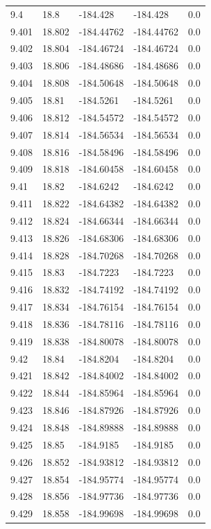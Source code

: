 \begin{tabular}{lllll}
9.4 & 18.8 & -184.428 & -184.428 & 0.0 \\
9.401 & 18.802 & -184.44762 & -184.44762 & 0.0 \\
9.402 & 18.804 & -184.46724 & -184.46724 & 0.0 \\
9.403 & 18.806 & -184.48686 & -184.48686 & 0.0 \\
9.404 & 18.808 & -184.50648 & -184.50648 & 0.0 \\
9.405 & 18.81 & -184.5261 & -184.5261 & 0.0 \\
9.406 & 18.812 & -184.54572 & -184.54572 & 0.0 \\
9.407 & 18.814 & -184.56534 & -184.56534 & 0.0 \\
9.408 & 18.816 & -184.58496 & -184.58496 & 0.0 \\
9.409 & 18.818 & -184.60458 & -184.60458 & 0.0 \\
9.41 & 18.82 & -184.6242 & -184.6242 & 0.0 \\
9.411 & 18.822 & -184.64382 & -184.64382 & 0.0 \\
9.412 & 18.824 & -184.66344 & -184.66344 & 0.0 \\
9.413 & 18.826 & -184.68306 & -184.68306 & 0.0 \\
9.414 & 18.828 & -184.70268 & -184.70268 & 0.0 \\
9.415 & 18.83 & -184.7223 & -184.7223 & 0.0 \\
9.416 & 18.832 & -184.74192 & -184.74192 & 0.0 \\
9.417 & 18.834 & -184.76154 & -184.76154 & 0.0 \\
9.418 & 18.836 & -184.78116 & -184.78116 & 0.0 \\
9.419 & 18.838 & -184.80078 & -184.80078 & 0.0 \\
9.42 & 18.84 & -184.8204 & -184.8204 & 0.0 \\
9.421 & 18.842 & -184.84002 & -184.84002 & 0.0 \\
9.422 & 18.844 & -184.85964 & -184.85964 & 0.0 \\
9.423 & 18.846 & -184.87926 & -184.87926 & 0.0 \\
9.424 & 18.848 & -184.89888 & -184.89888 & 0.0 \\
9.425 & 18.85 & -184.9185 & -184.9185 & 0.0 \\
9.426 & 18.852 & -184.93812 & -184.93812 & 0.0 \\
9.427 & 18.854 & -184.95774 & -184.95774 & 0.0 \\
9.428 & 18.856 & -184.97736 & -184.97736 & 0.0 \\
9.429 & 18.858 & -184.99698 & -184.99698 & 0.0 \\

\end{tabular}
